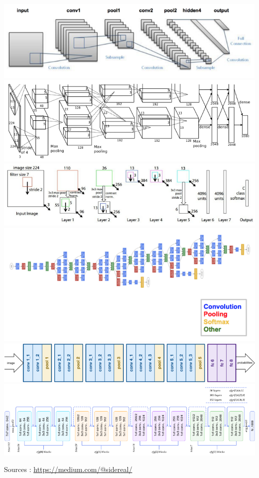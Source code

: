 \documentclass[11pt]{beamer}
\begin{document}
\begin{frame}
\includegraphics[scale=0.19]{img27.png}
\includegraphics[scale=0.19]{img28.png}
\includegraphics[scale=0.19]{img29.png}
\includegraphics[scale=0.19]{img30.png}
\includegraphics[scale=0.19]{img31.png}
\includegraphics[scale=0.19]{img26.png}
\\
\begin{center}
Sources : \href{https://medium.com/@sidereal/cnns-architectures-lenet-alexnet-vgg-googlenet-resnet-and-more-666091488df5}{https://medium.com/@sidereal/}
\end{center}
\end{frame}
\end{document}
